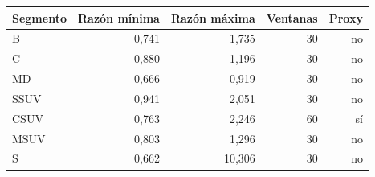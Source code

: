 \begin{tabular}{lrrrr}
\toprule
Segmento & Razón mínima & Razón máxima & Ventanas & Proxy \\
\midrule
B & 0,741 & 1,735 & 30 & no \\
C & 0,880 & 1,196 & 30 & no \\
MD & 0,666 & 0,919 & 30 & no \\
SSUV & 0,941 & 2,051 & 30 & no \\
CSUV & 0,763 & 2,246 & 60 & sí \\
MSUV & 0,803 & 1,296 & 30 & no \\
S & 0,662 & 10,306 & 30 & no \\
\bottomrule
\end{tabular}
